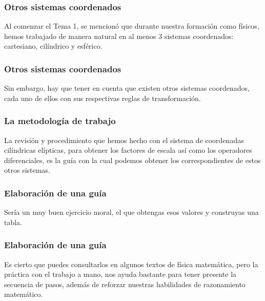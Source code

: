 \documentclass[12pt]{beamer}
\begin{document}
\begin{frame}
\frametitle{Otros sistemas coordenados}
Al comenzar el Tema 1, se mencionó que durante nuestra formación como físicos, hemos trabajado de manera natural en al menos $3$ sistemas coordenados: cartesiano, cilíndrico y esférico.
\end{frame}
\begin{frame}
\frametitle{Otros sistemas coordenados}
Sin embargo, hay que tener en cuenta que existen otros sistemas coordenados, cada uno de ellos con sus respectivas reglas de transformación.
\end{frame}
\begin{frame}
\frametitle{La metodología de trabajo}
La revisión y procedimiento que hemos hecho con el sistema de coordenadas cilíndricas elípticas, para obtener los factores de escala así como los operadores diferenciales, es la guía con la cual podemos obtener los correspondientes de estos otros sistemas.
\end{frame}
\begin{frame}
\frametitle{Elaboración de una guía}
Sería un muy buen ejercicio moral, el que obtengas esos valores y construyas una tabla.
\end{frame}
\begin{frame}
\frametitle{Elaboración de una guía}
Es cierto que puedes consultarlos en algunos textos de física matemática, pero la práctica con el trabajo a mano, nos ayuda bastante para tener presente la secuencia de pasos, además de reforzar nuestras habilidades de razonamiento matemático.
\end{frame}
\end{document}

